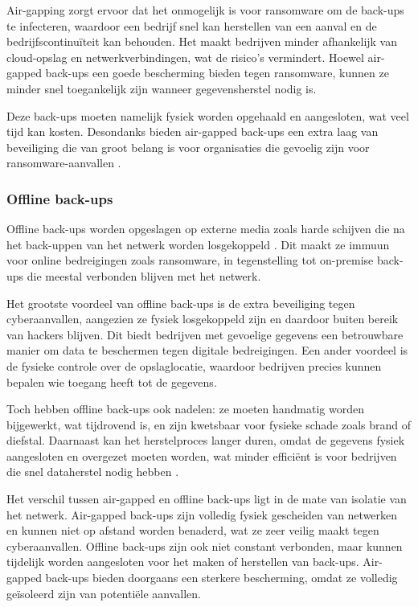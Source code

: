 Air-gapping zorgt ervoor dat het onmogelijk is voor ransomware om de back-ups te infecteren, waardoor een bedrijf snel kan herstellen van een aanval en de bedrijfscontinuïteit kan behouden. Het maakt bedrijven minder afhankelijk van cloud-opslag en netwerkverbindingen, wat de risico’s vermindert. Hoewel air-gapped back-ups een goede bescherming bieden tegen ransomware, kunnen ze minder snel toegankelijk zijn wanneer gegevensherstel nodig is. 

Deze back-ups moeten namelijk fysiek worden opgehaald en aangesloten, wat veel tijd kan kosten. Desondanks bieden air-gapped back-ups een extra laag van beveiliging die van groot belang is voor organisaties die gevoelig zijn voor ransomware-aanvallen \autocite{Park2023}.

\subsubsection{Offline back-ups}
Offline back-ups worden opgeslagen op externe media zoals harde schijven die na het back-uppen van het netwerk worden losgekoppeld \autocite{Edwards2022}. Dit maakt ze immuun voor online bedreigingen zoals ransomware, in tegenstelling tot on-premise back-ups die meestal verbonden blijven met het netwerk. 

Het grootste voordeel van offline back-ups is de extra beveiliging tegen cyberaanvallen, aangezien ze fysiek losgekoppeld zijn en daardoor buiten bereik van hackers blijven. Dit biedt bedrijven met gevoelige gegevens een betrouwbare manier om data te beschermen tegen digitale bedreigingen. Een ander voordeel is de fysieke controle over de opslaglocatie, waardoor bedrijven precies kunnen bepalen wie toegang heeft tot de gegevens. 

Toch hebben offline back-ups ook nadelen: ze moeten handmatig worden bijgewerkt, wat tijdrovend is, en zijn kwetsbaar voor fysieke schade zoals brand of diefstal. Daarnaast kan het herstelproces langer duren, omdat de gegevens fysiek aangesloten en overgezet moeten worden, wat minder efficiënt is voor bedrijven die snel dataherstel nodig hebben \autocite{James2019}. 

Het verschil tussen air-gapped en offline back-ups ligt in de mate van isolatie van het netwerk. Air-gapped back-ups zijn volledig fysiek gescheiden van netwerken en kunnen niet op afstand worden benaderd, wat ze zeer veilig maakt tegen cyberaanvallen. Offline back-ups zijn ook niet constant verbonden, maar kunnen tijdelijk worden aangesloten voor het maken of herstellen van back-ups. Air-gapped back-ups bieden doorgaans een sterkere bescherming, omdat ze volledig geïsoleerd zijn van potentiële aanvallen.

